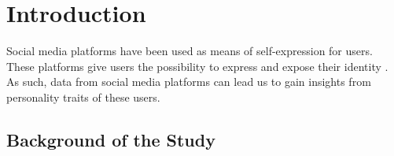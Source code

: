 %
%
%                 

\chapter{Introduction}
\label{sec:intro}    %

Social media platforms have been used as means of self-expression for users. These platforms give users the possibility to express and expose their identity \citep{Marcus2006}. As such, data from social media platforms can lead us to gain insights from personality traits of these users. 




\section{Background of the Study}
\label{sec:overview}

%
%





